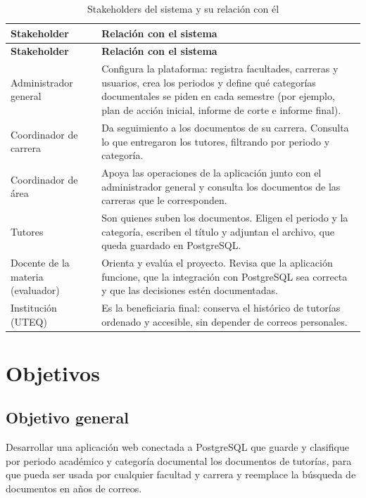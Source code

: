 \documentclass[12pt,a4paper,oneside]{article}
\begin{document}
\begin{longtable}{>{\raggedright\arraybackslash}p{3.7cm}>{\raggedright\arraybackslash}p{11.3cm}}
\caption{Stakeholders del sistema y su relación con él}\label{tab:stakeholders}\\
\toprule
\textbf{Stakeholder} & \textbf{Relación con el sistema} \\
\midrule
\endfirsthead
\toprule
\textbf{Stakeholder} & \textbf{Relación con el sistema} \\
\midrule
\endhead
Administrador general &
Configura la plataforma: registra facultades, carreras y usuarios, crea los periodos
y define qué categorías documentales se piden en cada semestre (por ejemplo, plan de
acción inicial, informe de corte e informe final). \\
\addlinespace
Coordinador de carrera &
Da seguimiento a los documentos de su carrera. Consulta lo que entregaron los tutores,
filtrando por periodo y categoría. \\
\addlinespace
Coordinador de área &
Apoya las operaciones de la aplicación junto con el administrador general y consulta
los documentos de las carreras que le corresponden. \\
\addlinespace
Tutores &
Son quienes suben los documentos. Eligen el periodo y la categoría, escriben el título
y adjuntan el archivo, que queda guardado en PostgreSQL. \\
\addlinespace
Docente de la materia (evaluador) &
Orienta y evalúa el proyecto. Revisa que la aplicación funcione, que la integración con
PostgreSQL sea correcta y que las decisiones estén documentadas. \\
\addlinespace
Institución (UTEQ) &
Es la beneficiaria final: conserva el histórico de tutorías ordenado y accesible,
sin depender de correos personales. \\
\bottomrule
\end{longtable}

\section{Objetivos}

\subsection{Objetivo general}

Desarrollar una aplicación web conectada a PostgreSQL que guarde y clasifique por
periodo académico y categoría documental los documentos de tutorías, para que pueda
ser usada por cualquier facultad y carrera y reemplace la búsqueda de documentos en
años de correos.
\end{document}
